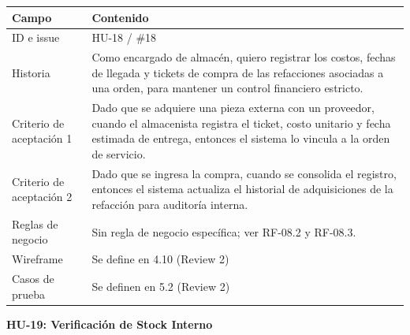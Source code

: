 {\def\LTcaptype{none} %
\begin{longtable}[]{@{}
  >{\raggedright\arraybackslash}p{}
  >{\raggedright\arraybackslash}p{}@{}}
\toprule\noalign{}
\begin{minipage}[b]{\linewidth}\raggedright
\textbf{Campo}
\end{minipage} & \begin{minipage}[b]{\linewidth}\raggedright
\textbf{Contenido}
\end{minipage} \\
\midrule\noalign{}
\endhead
\bottomrule\noalign{}
\endlastfoot
ID e issue & HU-18 / \#18 \\
Historia & Como encargado de almacén, quiero registrar los costos,
fechas de llegada y tickets de compra de las refacciones asociadas a una
orden, para mantener un control financiero estricto. \\
Criterio de aceptación 1 & Dado que se adquiere una pieza externa con un
proveedor, cuando el almacenista registra el ticket, costo unitario y
fecha estimada de entrega, entonces el sistema lo vincula a la orden de
servicio. \\
Criterio de aceptación 2 & Dado que se ingresa la compra, cuando se
consolida el registro, entonces el sistema actualiza el historial de
adquisiciones de la refacción para auditoría interna. \\
Reglas de negocio & Sin regla de negocio específica; ver RF-08.2 y
RF-08.3. \\
Wireframe & Se define en 4.10 (Review 2) \\
Casos de prueba & Se definen en 5.2 (Review 2) \\
\end{longtable}
}

\textbf{HU-19: Verificación de Stock Interno}

